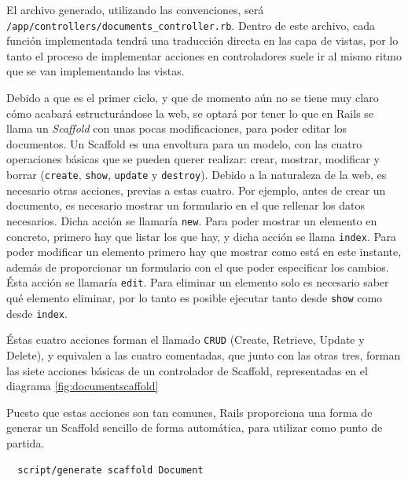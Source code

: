 El archivo generado, utilizando las convenciones, será \texttt{/app/controllers/documents\_controller.rb}. Dentro de este archivo, cada función implementada tendrá una traducción directa en las capa de vistas, por lo tanto el proceso de implementar acciones en controladores suele ir al mismo ritmo que se van implementando las vistas.

Debido a que es el primer ciclo, y que de momento aún no se tiene muy claro cómo acabará estructurándose la web, se optará por tener lo que en Rails se llama un \emph{Scaffold} con unas pocas modificaciones, para poder editar los documentos. Un Scaffold es una envoltura para un modelo, con las cuatro operaciones básicas que se pueden querer realizar: crear, mostrar, modificar y borrar (\texttt{create}, \texttt{show}, \texttt{update} y \texttt{destroy}). Debido a la naturaleza de la web, es necesario otras acciones, previas a estas cuatro. Por ejemplo, antes de crear un documento, es necesario mostrar un formulario en el que rellenar los datos necesarios. Dicha acción se llamaría \texttt{new}. Para poder mostrar un elemento en concreto, primero hay que listar los que hay, y dicha acción se llama \texttt{index}. Para poder modificar un elemento primero hay que mostrar como está en este instante, además de proporcionar un formulario con el que poder especificar los cambios. Ésta acción se llamaría \texttt{edit}. Para eliminar un elemento solo es necesario saber qué elemento eliminar, por lo tanto es posible ejecutar tanto desde \texttt{show} como desde \texttt{index}.

Éstas cuatro acciones forman el llamado \texttt{CRUD} (Create, Retrieve, Update y Delete), y equivalen a las cuatro comentadas, que junto con las otras tres, forman las siete acciones básicas de un controlador de Scaffold, representadas en el diagrama \ref{fig:documentscaffold}

Puesto que estas acciones son tan comunes, Rails proporciona una forma de generar un Scaffold sencillo de forma automática, para utilizar como punto de partida.

\begin{verbatim}
  script/generate scaffold Document
\end{verbatim}

